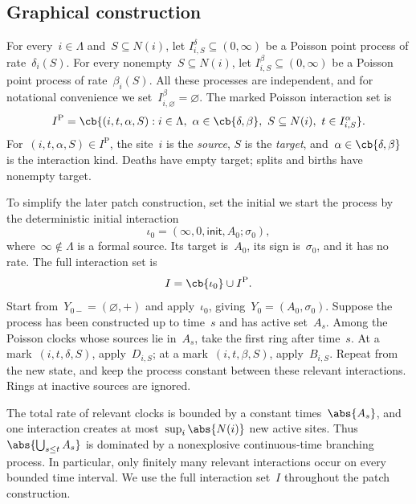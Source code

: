 \subsection{Graphical construction}
\label{subsec:dual-graphical-construction}

For every~$i\in\Lambda$ and~$S\subseteq N(i)$, let
$I_{i,S}^\delta\subseteq(0,\infty)$ be a Poisson point process of
rate~$\delta_i(S)$. For every nonempty~$S\subseteq N(i)$, let
$I_{i,S}^\beta\subseteq(0,\infty)$ be a Poisson point process of
rate~$\beta_i(S)$. All these processes are independent, and for notational
convenience we set~$I_{i,\varnothing}^\beta=\varnothing$. The marked Poisson
interaction set is
\begin{equation*}
I^{\mathrm P}
=
\cb{(i,t,\alpha,S):i\in\Lambda,\ \alpha\in\cb{\delta,\beta},\
S\subseteq N(i),\ t\in I_{i,S}^\alpha}.
\end{equation*}
For~$(i,t,\alpha,S)\in I^{\mathrm P}$, the site~$i$ is the \emph{source},
$S$ is the \emph{target}, and~$\alpha\in\cb{\delta,\beta}$ is the interaction
kind. Deaths have empty target; splits and births have nonempty target.


To simplify the later patch construction, set the initial
we start the process by the deterministic initial interaction
\begin{equation}
\label{eq:initial-interaction}
\iota_0
=
(\infty,0,\mathsf{init},A_0;\sigma_0),
\end{equation}
where~$\infty\notin\Lambda$ is a formal source. Its target is~$A_0$, its sign
is~$\sigma_0$, and it has no rate. The full interaction set is
\begin{equation*}
I=\cb{\iota_0}\cup I^{\mathrm P}.
\end{equation*}
Start from~$Y_{0-}=(\varnothing,+)$ and apply~$\iota_0$,
giving~$Y_0=(A_0,\sigma_0)$. Suppose the process has been constructed up to
time~$s$ and has active set~$A_s$. Among the Poisson clocks whose sources lie
in~$A_s$, take the first ring after time~$s$. At a
mark~$(i,t,\delta,S)$, apply~$D_{i,S}$; at a mark~$(i,t,\beta,S)$,
apply~$B_{i,S}$. Repeat from the new state, and keep the process constant between
these relevant interactions. Rings at inactive sources are ignored.

The total rate of relevant clocks is bounded by a constant times~$\abs{A_s}$,
and one interaction creates at most~$\sup_i\abs{N(i)}$ new active sites.
Thus~$\abs{\bigcup_{s\leq t} A_s}$ is dominated by a nonexplosive continuous-time branching
process. In particular, only finitely many relevant interactions occur on every
bounded time interval. We use the full interaction set~$I$ throughout the
patch construction.

